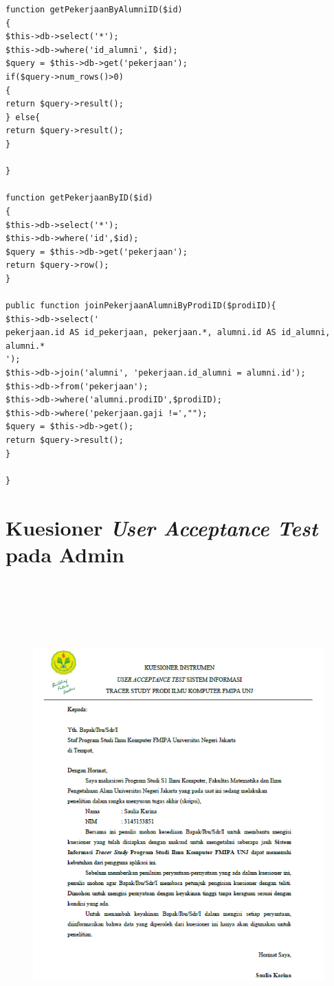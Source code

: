\begin{verbatim}
function getPekerjaanByAlumniID($id)
{
$this->db->select('*');
$this->db->where('id_alumni', $id);
$query = $this->db->get('pekerjaan');
if($query->num_rows()>0)
{
return $query->result();
} else{
return $query->result();
}

}

function getPekerjaanByID($id)
{
$this->db->select('*');
$this->db->where('id',$id);
$query = $this->db->get('pekerjaan');
return $query->row();
}

public function joinPekerjaanAlumniByProdiID($prodiID){
$this->db->select('
pekerjaan.id AS id_pekerjaan, pekerjaan.*, alumni.id AS id_alumni, alumni.*
');
$this->db->join('alumni', 'pekerjaan.id_alumni = alumni.id');
$this->db->from('pekerjaan');
$this->db->where('alumni.prodiID',$prodiID);
$this->db->where('pekerjaan.gaji !=',"");
$query = $this->db->get();
return $query->result();
}

}

\end{verbatim}

\chapter{Kuesioner \textit{User Acceptance Test} pada Admin}

\begin{figure}[H]
	\centering
	\includegraphics[width=15cm,height=18cm]{gambar/UAT/surat kuesioner}
	\label{surat_kuesioner}
\end{figure}

